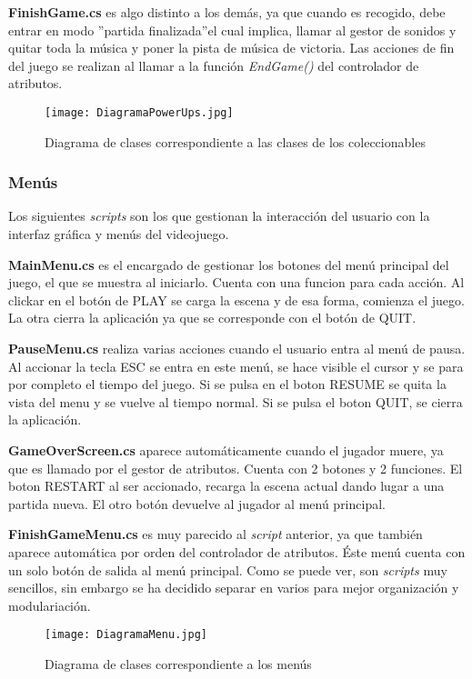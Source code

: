 \textbf{FinishGame.cs} es algo distinto a los demás, ya que cuando es recogido, debe entrar en modo ''partida finalizada''el cual implica, llamar al gestor de sonidos y quitar toda la música y poner la pista de música de victoria. Las acciones de fin del juego se realizan al llamar a la función \textit{EndGame()} del controlador de atributos. 

\begin{figure}[H]
    \centering
    \texttt{[image: DiagramaPowerUps.jpg]}
    \caption{Diagrama de clases correspondiente a las clases de los coleccionables}
\end{figure}

\subsubsection{Menús}

Los siguientes \textit{scripts} son los que gestionan la interacción del usuario con la interfaz gráfica y menús del videojuego.

\textbf{MainMenu.cs} es el encargado de gestionar los botones del menú principal del juego, el que se muestra al iniciarlo. Cuenta con una funcion para cada acción. Al clickar en el botón de PLAY se carga la escena y de esa forma, comienza el juego. La otra cierra la aplicación ya que se corresponde con el botón de QUIT.

\textbf{PauseMenu.cs} realiza varias acciones cuando el usuario entra al menú de pausa. Al accionar la tecla ESC se entra en este menú, se hace visible el cursor y se para por completo el tiempo del juego. Si se pulsa en el boton RESUME se quita la vista del menu y se vuelve al tiempo normal. Si se pulsa el boton QUIT, se cierra la aplicación.

\textbf{GameOverScreen.cs} aparece automáticamente cuando el jugador muere, ya que es llamado por el gestor de atributos. Cuenta con 2 botones y 2 funciones. El boton RESTART al ser accionado, recarga la escena actual dando lugar a una partida nueva. El otro botón devuelve al jugador al menú principal. 

\textbf{FinishGameMenu.cs} es muy parecido al \textit{script} anterior, ya que también aparece automática por orden del controlador de atributos. Éste menú cuenta con un solo botón de salida al menú principal. Como se puede ver, son \textit{scripts} muy sencillos, sin embargo se ha decidido separar en varios para mejor organización y modulariación.

\begin{figure}[H]
    \centering
    \texttt{[image: DiagramaMenu.jpg]}
    \caption{Diagrama de clases correspondiente a los menús}
\end{figure}

